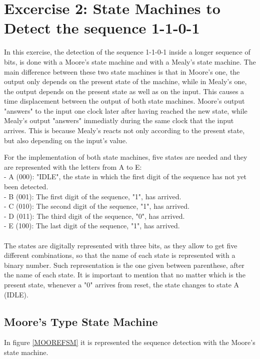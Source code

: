 

\section{\color{olive}Excercise 2: State Machines to Detect the sequence 1-1-0-1}
In this exercise, the detection of the sequence 1-1-0-1 inside a longer sequence of bits, is done with a Moore's state machine and with a Mealy's state machine. The main difference between these two state machines is that in Moore's one, the output only depends on the present state of the machine, while in Mealy's one, the output depends on the present state as well as on the input. This causes a time displacement between the output of both state machines. Moore's output "answers" to the input one clock later after having reached the new state, while Mealy's output "answers" immediatly during the same clock that the input arrives. This is because Mealy's reacts not only according to the present state, but also depending on the input's value.

For the implementation of both state machines, five states are needed and they are represented with the letters from A to E:\\ 
- A (000): "IDLE", the state in which the first digit of the sequence has not yet been detected.\\
- B (001): The first digit of the sequence, "1", has arrived.\\
- C (010): The second digit of the sequence, "1",  has arrived.\\
- D (011): The third digit of the sequence, "0", has arrived.\\
- E (100): The last digit of the sequence, "1", has arrived.\\ \\
The states are digitally represented with three bits, as they allow to get five different combinations, so that the name of each state is represented with a binary number. Such representation is the one given between parenthese, after the name of each state.  It is important to mention that no matter which is the present state, whenever a "0" arrives from reset, the state changes to state A (IDLE). 

\subsection{\color{purple}Moore's Type State Machine}

In figure \ref {MOOREFSM} it is represented the sequence detection with the Moore's state machine.

